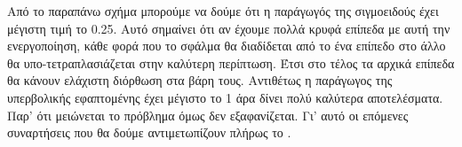 \begin{figure}[H]
    \centering
    \begin{subfigure}{0.49\textwidth}
        \centering
        \caption{}
    \end{subfigure}
    \begin{subfigure}{0.49\textwidth}
        \centering
        \caption{}
    \end{subfigure}
    \caption{}
\end{figure}
Από το παραπάνω σχήμα μπορούμε να δούμε ότι η παράγωγός της σιγμοειδούς έχει μέγιστη τιμή το 0.25. Αυτό σημαίνει ότι αν έχουμε πολλά κρυφά επίπεδα με αυτή την ενεργοποίηση, κάθε φορά που το σφάλμα θα διαδίδεται από το ένα επίπεδο στο άλλο
θα υπο-τετραπλασιάζεται στην καλύτερη περίπτωση. Έτσι στο τέλος τα αρχικά επίπεδα θα κάνουν ελάχιστη διόρθωση στα βάρη τους. Αντιθέτως η παράγωγος της υπερβολικής εφαπτομένης έχει μέγιστο το 1 άρα δίνει πολύ καλύτερα αποτελέσματα. Παρ' ότι
μειώνεται το πρόβλημα όμως δεν εξαφανίζεται. Γι' αυτό οι επόμενες συναρτήσεις που θα δούμε αντιμετωπίζουν πλήρως το .

